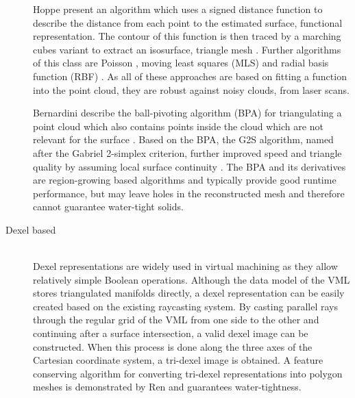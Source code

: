\begin{description}
	Hoppe \etal present an algorithm which uses a signed distance function to describe the distance from each point to the estimated surface, \ie functional representation.
	The contour of this function is then traced by a marching cubes variant to extract an isosurface, \ie triangle mesh \cite{sdf_surface_reconstruction}.
	Further algorithms of this class are Poisson \cite{poisson}, moving least squares (MLS) \cite{mls} and radial basis function (RBF) \cite{rbf}.
	As all of these approaches are based on fitting a function into the point cloud, they are robust against noisy clouds, \eg from laser scans.

	Bernardini \etal describe the ball-pivoting algorithm (BPA) for triangulating a point cloud which also contains points inside the cloud which are not relevant for the surface \cite{bpa}.
	Based on the BPA, the G2S algorithm, named after the Gabriel 2-simplex criterion, further improved speed and triangle quality by assuming local surface continuity \cite{g2s}.
	The BPA and its derivatives are region-growing based algorithms and typically provide good runtime performance, but may leave holes in the reconstructed mesh and therefore cannot guarantee water-tight solids.


	\item[Dexel based] \hfill \\
	Dexel representations are widely used in virtual machining as they allow relatively simple Boolean operations.
	Although the data model of the VML stores triangulated manifolds directly, a dexel representation can be easily created based on the existing raycasting system.
	By casting parallel rays through the regular grid of the VML from one side to the other and continuing after a surface intersection, a valid dexel image can be constructed.
	When this process is done along the three axes of the Cartesian coordinate system, a tri-dexel image is obtained.
	A feature conserving algorithm for converting tri-dexel representations into polygon meshes is demonstrated by Ren \etal \cite{tridexel_reconstruction} and guarantees water-tightness.



\end{description}

